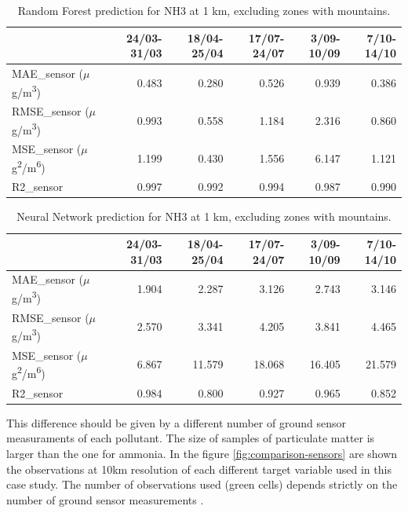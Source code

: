 \begin{table}[H]
\begin{tabular}{lrrrrr}
\toprule
  &  24/03-31/03 &  18/04-25/04 &  17/07-24/07 &  3/09-10/09 &  7/10-14/10 \\
\midrule
 MAE\_sensor ($\mu$g/m\textsuperscript{3}) &        0.483 &        0.280 &        0.526 &       0.939 &       0.386 \\
RMSE\_sensor ($\mu$g/m\textsuperscript{3}) &        0.993 &        0.558 &        1.184 &       2.316 &       0.860 \\
 MSE\_sensor ($\mu$g\textsuperscript{2}/m\textsuperscript{6}) &        1.199 &        0.430 &        1.556 &       6.147 &       1.121 \\
  R2\_sensor  &        0.997 &        0.992 &        0.994 &       0.987 &       0.990 \\
\bottomrule
\end{tabular}
\caption{Random Forest prediction for NH3 at 1 km, excluding zones with mountains.}
\label{tab:nh3RF}
\end{table}
\begin{table}[H]
\begin{tabular}{lrrrrr}
\toprule
  &  24/03-31/03 &  18/04-25/04 &  17/07-24/07 &  3/09-10/09 &  7/10-14/10 \\
\midrule
 MAE\_sensor ($\mu$g/m\textsuperscript{3})&        1.904 &        2.287 &        3.126 &       2.743 &       3.146 \\
RMSE\_sensor ($\mu$g/m\textsuperscript{3}) &        2.570 &        3.341 &        4.205 &       3.841 &       4.465 \\
 MSE\_sensor ($\mu$g\textsuperscript{2}/m\textsuperscript{6}) &        6.867 &       11.579 &       18.068 &      16.405 &      21.579 \\
  R2\_sensor &        0.984 &        0.800 &        0.927 &       0.965 &       0.852 \\
\bottomrule
\end{tabular}
\caption{Neural Network prediction for NH3 at 1 km, excluding zones with mountains.}
\label{tab:nh3NN}
\end{table}
This difference should be given by a different number of ground sensor measuraments of each pollutant. The size of samples of particulate matter is larger than the one for ammonia.
In the figure \ref{fig:comparison-sensors} are shown the observations at 10km resolution of each different target variable used in this case study. The number of observations used (green cells) depends strictly on the number of ground sensor measurements . \\
